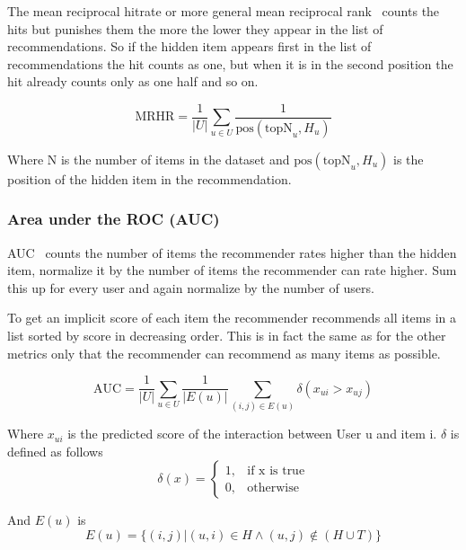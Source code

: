 The mean reciprocal hitrate or more general mean reciprocal
rank~\cite{DBLP:conf/icdm/NingK11} counts the hits but punishes them the more the lower they
appear in the list of recommendations. So if the hidden item appears
first in the list of recommendations the hit counts as one, but when
it is in the second position the hit already counts only as one half
and so on.

\begin{equation}
\text{MRHR}=\frac{1}{|U|} \sum_{u \in U} \frac{1}{\text{pos}(\text{topN}_{u},H_{u})}
\end{equation}

Where N is the number of items in the dataset and \(\text{pos}(\text{topN}_{u},H_{u})\)
is the position of the hidden item in the recommendation.


\subsubsection{Area under the ROC (AUC)}

AUC~\cite{Rendle:2009:BBP:1795114.1795167} counts the number of items the recommender rates
higher than the hidden item, normalize it by the number of items the
recommender can rate higher. Sum this up for every user and again
normalize by the number of users.

To get an implicit score of each item the recommender recommends all
items in a list sorted by score in decreasing order. This is in fact the same
as for the other metrics only that the recommender can recommend as
many items as possible.

\begin{equation}
\text{AUC}=\frac{1}{|U|}\sum_{u \in U} \frac{1}{|E(u)|} \sum_{(i,j) \in E(u)} \delta(x_{ui}>x_{uj})
\end{equation}

Where \(x_{ui}\) is the predicted score of the interaction between User u and item i.
\(\delta\) is defined as follows
\begin{equation}
\delta(x)=\begin{cases}1, & \text{if x is true} \\
                       0, & \text{otherwise}
\end{cases}
\end{equation}

And \(E(u)\) is 
\begin{equation}
E(u) =\{(i,j)|(u,i) \in H \land (u,j) \not\in (H \cup T)\}
\end{equation}


